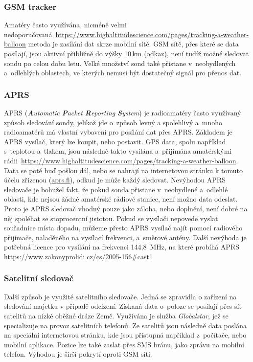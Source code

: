 \documentclass[twoside]{ctuthesis}
\theoremstyle{plain}
\theoremstyle{definition}
\theoremstyle{note}
\begin{document}
				\subsubsection{GSM tracker}
				Amatéry často využívána, nicméně velmi nedoporučovaná~\url{https://www.highaltitudescience.com/pages/tracking-a-weather-balloon} metoda je zasílání dat skrze mobilní sítě. GSM sítě, přes které se data posílají, jsou aktivní přibližně do výšky 10\,km (odkaz), není tudíž možné sledovat sondu po celou dobu letu. Velké množství sond také přistane v~neobydlených a~odlehlých oblastech, ve kterých nemusí být dostatečný signál pro přenos dat.


				\subsubsection{APRS}
				APRS (\textit{\textbf{A}utomatic \textbf{P}acket \textbf{R}eporting \textbf{S}ystem}) je radioamatéry často využívaný způsob sledování sondy, jelikož jde o~způsob levný a spolehlivý a~mnoho radioamatérů má vlastní vybavení pro posílání dat přes APRS. Základem je APRS vysílač, který lze koupit, nebo postavit. GPS data, spolu například s~teplotou a~tlakem, jsou následně takto vysílána a~přijímána amatérskými rádii~\url{https://www.highaltitudescience.com/pages/tracking-a-weather-balloon}. Data se poté buď pošlou dál, nebo se nahrají na internetovou stránku k tomuto účelu zřízenou (\url{aprs.fi}), odkud je může každý sledovat.
				Nevýhodou APRS sledovače je bohužel fakt, že pokud sonda přistane v~neobydlené a~odlehlé oblasti, kde nejsou žádné amatérské rádiové stanice, není možno data odeslat. Proto je APRS sledovač vhodný pouze jako záloha, nebo doplnění, není dobré na něj spoléhat se stoprocentní jistotou. Pokud se vysílači nepovede vyslat souřadnice místa dopadu, můžeme přesto APRS vysílač najít pomocí radiového přijímače, naladěného na vysílací frekvenci, a~směrové antény. Další nevýhoda je potřebná licence pro vysílání na frekvenci 144,8~MHz, na které probíhá APRS \url{https://www.zakonyprolidi.cz/cs/2005-156#cast1}


				\subsubsection{Satelitní sledovač}
				Další způsob je využité satelitního sledovače. Jedná se zpravidla o zařízení na sledování majetku v případě odcizení. Získaná data o~poloze se posílají přes síť satelitů na nízké oběžné dráze Země. Využívána je služba \textit{Globalstar}, jež se specializuje na provoz satelitních telefonů. Ze satelitů jsou následně data poslána na speciální internetovou stránku, kde jsou přístupná například z~počítače, nebo mobilní aplikace. Pozice lze také zaslat přes SMS bránu, jako zprávu na mobilní telefon. Výhodou je širší pokrytí oproti GSM síti. 
\end{document}
